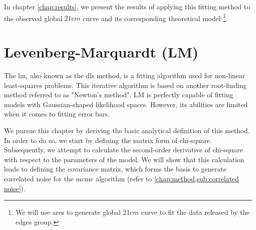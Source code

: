\documentclass[12pt, TexShade, letterpaper]{report}
\begin{document}
In chapter \ref{chap:results}, we present the results of applying this fitting method to the observed global $21cm$ curve and its corresponding theoretical model \footnote{We will use \gls{ares} to generate global $21cm$ curve to fit the data released by the \gls{edges} group.}.\par
\section{Levenberg-Marquardt (LM)}
\label{chap:method,sub:LM}
The \gls{lm}, also known as the \gls{dls} method, is a fitting algorithm used for non-linear least-squares problems. This iterative algorithm is based on another root-finding method referred to as "Newton's method". LM is perfectly capable of fitting models with Gaussian-shaped likelihood spaces. However, its abilities are limited when it comes to fitting error bars.\par
We pursue this chapter by deriving the basic analytical definition of this method. In order to do so, we start by defining the matrix form of chi-square. Subsequently, we attempt to calculate the second-order derivative of chi-square with respect to the parameters of the model. We will show that this calculation leads to defining the covariance matrix, which forms the basis to generate correlated noise for the \gls{mcmc} algorithm (refer to \ref{chap:method,sub:correlated noise}).\par
\end{document}
